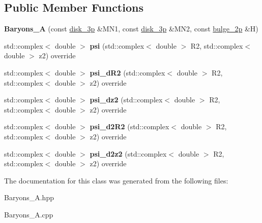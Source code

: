 \subsection*{Public Member Functions}
\begin{DoxyCompactItemize}
\item 
\mbox{\label{classBaryons__A_aa8aaefeb549270069dc70609baf120c6}} 
{\bfseries Baryons\+\_\+A} (const \hyperlink{structdisk__3p}{disk\+\_\+3p} \&M\+N1, const \hyperlink{structdisk__3p}{disk\+\_\+3p} \&M\+N2, const \hyperlink{structbulge__2p}{bulge\+\_\+2p} \&H)
\item 
\mbox{\label{classBaryons__A_a55bbcf0080e00ea1cfb8677095c66cd7}} 
std\+::complex$<$ double $>$ {\bfseries psi} (std\+::complex$<$ double $>$ R2, std\+::complex$<$ double $>$ z2) override
\item 
\mbox{\label{classBaryons__A_a27b009b4504623801857cdb34abd53d9}} 
std\+::complex$<$ double $>$ {\bfseries psi\+\_\+d\+R2} (std\+::complex$<$ double $>$ R2, std\+::complex$<$ double $>$ z2) override
\item 
\mbox{\label{classBaryons__A_a56a5fd239324b130fe6f254e396ae114}} 
std\+::complex$<$ double $>$ {\bfseries psi\+\_\+dz2} (std\+::complex$<$ double $>$ R2, std\+::complex$<$ double $>$ z2) override
\item 
\mbox{\label{classBaryons__A_ac11e79381c117e51b18440c9fb638b21}} 
std\+::complex$<$ double $>$ {\bfseries psi\+\_\+d2\+R2} (std\+::complex$<$ double $>$ R2, std\+::complex$<$ double $>$ z2) override
\item 
\mbox{\label{classBaryons__A_a168cdc73e42dda57d1e112a588c2e24d}} 
std\+::complex$<$ double $>$ {\bfseries psi\+\_\+d2z2} (std\+::complex$<$ double $>$ R2, std\+::complex$<$ double $>$ z2) override
\end{DoxyCompactItemize}


The documentation for this class was generated from the following files\+:\begin{DoxyCompactItemize}
\item 
Baryons\+\_\+\+A.\+hpp\item 
Baryons\+\_\+\+A.\+cpp\end{DoxyCompactItemize}
